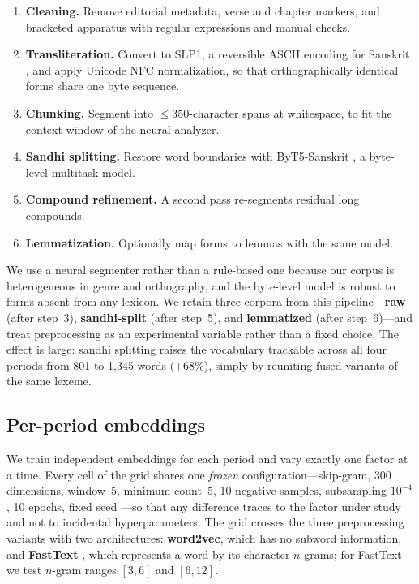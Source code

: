 \begin{enumerate}\setlength{\itemsep}{1pt}
  \item \textbf{Cleaning.} Remove editorial metadata, verse and chapter markers, and bracketed
        apparatus with regular expressions and manual checks.
  \item \textbf{Transliteration.} Convert to SLP1, a reversible ASCII encoding for Sanskrit
        \citep{slp1}, and apply Unicode NFC normalization, so that orthographically identical
        forms share one byte sequence.
  \item \textbf{Chunking.} Segment into ${\le}350$-character spans at whitespace, to fit the
        context window of the neural analyzer.
  \item \textbf{Sandhi splitting.} Restore word boundaries with ByT5-Sanskrit
        \citep{nehrdich2024byt5}, a byte-level multitask model.
  \item \textbf{Compound refinement.} A second pass re-segments residual long compounds.
  \item \textbf{Lemmatization.} Optionally map forms to lemmas with the same model.
\end{enumerate}

We use a neural segmenter rather than a rule-based one \citep{huet2009heritage} because our
corpus is heterogeneous in genre and orthography, and the byte-level model is robust to forms
absent from any lexicon. We retain three corpora from this pipeline---\textbf{raw} (after
step~3), \textbf{sandhi-split} (after step~5), and \textbf{lemmatized} (after step~6)---and
treat preprocessing as an experimental variable rather than a fixed choice. The effect is
large: sandhi splitting raises the vocabulary trackable across all four periods from 801 to
1{,}345 words ($+68\%$), simply by reuniting fused variants of the same lexeme.

\subsection{Per-period embeddings}
\label{sec:emb}
We train independent embeddings for each period and vary exactly one factor at a time. Every
cell of the grid shares one \emph{frozen} configuration---skip-gram, 300 dimensions, window~5,
minimum count~5, 10 negative samples, subsampling $10^{-4}$, 10 epochs, fixed seed
\citep{mikolov2013,gensim2010}---so that any difference traces to the factor under study and
not to incidental hyperparameters. The grid crosses the three preprocessing variants with two
architectures: \textbf{word2vec}, which has no subword information, and \textbf{FastText}
\citep{bojanowski2017}, which represents a word by its character $n$-grams; for FastText we test
$n$-gram ranges $[3,6]$ and $[6,12]$.

